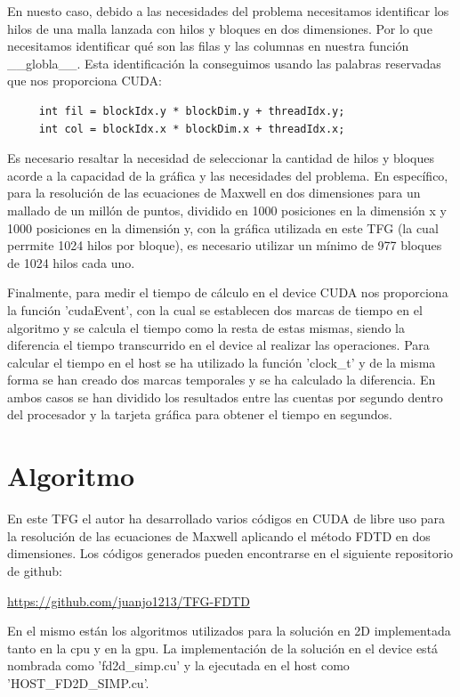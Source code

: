 \documentclass[11pt,a4paper,twoside,pdf]{article}
\numberwithin{equation}{section}
\begin{document}
En nuesto caso, debido a las necesidades del problema necesitamos identificar los hilos de una malla lanzada con hilos y bloques en dos dimensiones. Por lo que necesitamos identificar qué son las filas y las columnas en nuestra función \_\_globla\_\_. Esta identificación la conseguimos usando las palabras reservadas que nos proporciona CUDA:

\begin{verbatim}
     int fil = blockIdx.y * blockDim.y + threadIdx.y;
     int col = blockIdx.x * blockDim.x + threadIdx.x;
\end{verbatim}

Es necesario resaltar la necesidad de seleccionar la cantidad de hilos y bloques acorde a la capacidad de la gráfica y las necesidades del problema. En específico, para la resolución de las ecuaciones de Maxwell en dos dimensiones para un mallado de un millón de puntos, dividido en 1000 posiciones en la dimensión x y 1000 posiciones en la dimensión y, con la gráfica utilizada en este TFG (la cual perrmite 1024 hilos por bloque), es necesario utilizar un mínimo de 977 bloques de 1024 hilos cada uno.


Finalmente, para medir el tiempo de cálculo en el device CUDA nos proporciona la función 'cudaEvent', con la cual se establecen dos marcas de tiempo en el algoritmo y se calcula el tiempo como la resta de estas mismas, siendo la diferencia el tiempo transcurrido en el device al realizar las operaciones.
Para calcular el tiempo en el host se ha utilizado la función 'clock\_t' y de la misma forma se han creado dos marcas temporales y se ha calculado la diferencia. En ambos casos se han dividido los resultados entre las cuentas por segundo dentro del procesador y la tarjeta gráfica para obtener el tiempo en segundos.

\section{Algoritmo}
En este TFG el autor ha desarrollado varios códigos en CUDA de libre uso para la resolución de las ecuaciones de Maxwell aplicando el método FDTD en dos dimensiones. Los códigos generados pueden encontrarse en el siguiente repositorio de github:

\url{https://github.com/juanjo1213/TFG-FDTD}

En el mismo están los algoritmos utilizados para la solución en 2D implementada tanto en la cpu y en la gpu. La implementación de la solución en el device está nombrada como 'fd2d\_simp.cu' y la ejecutada en el host como 'HOST\_FD2D\_SIMP.cu'.
\end{document}
